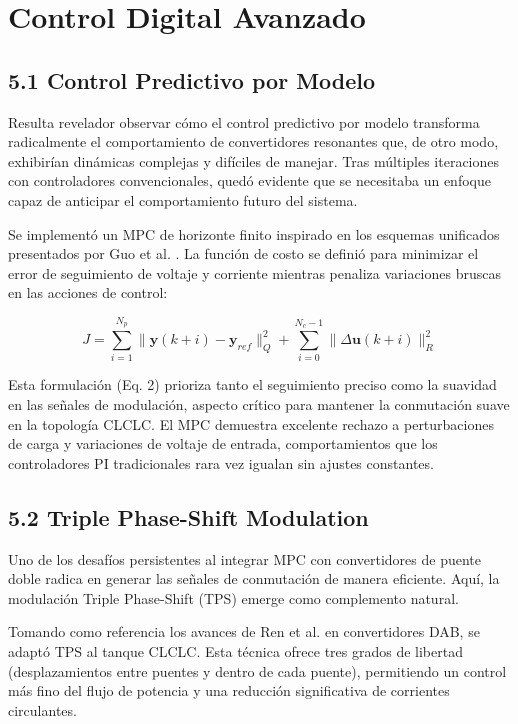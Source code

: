 \section{Control Digital Avanzado}

\subsection{5.1 Control Predictivo por Modelo}

Resulta revelador observar cómo el control predictivo por modelo transforma radicalmente el comportamiento de convertidores resonantes que, de otro modo, exhibirían dinámicas complejas y difíciles de manejar. Tras múltiples iteraciones con controladores convencionales, quedó evidente que se necesitaba un enfoque capaz de anticipar el comportamiento futuro del sistema.

Se implementó un MPC de horizonte finito inspirado en los esquemas unificados presentados por Guo et al. \cite{Guo2025_MPC}. La función de costo se definió para minimizar el error de seguimiento de voltaje y corriente mientras penaliza variaciones bruscas en las acciones de control:

\begin{equation}
\label{eq:cost_function}
J = \sum_{i=1}^{N_p} \| \mathbf{y}(k+i) - \mathbf{y}_{ref} \|^2_Q + \sum_{i=0}^{N_c-1} \| \Delta \mathbf{u}(k+i) \|^2_R
\end{equation}

Esta formulación (Eq. 2) prioriza tanto el seguimiento preciso como la suavidad en las señales de modulación, aspecto crítico para mantener la conmutación suave en la topología CLCLC. El MPC demuestra excelente rechazo a perturbaciones de carga y variaciones de voltaje de entrada, comportamientos que los controladores PI tradicionales rara vez igualan sin ajustes constantes.

\subsection{5.2 Triple Phase-Shift Modulation}

Uno de los desafíos persistentes al integrar MPC con convertidores de puente doble radica en generar las señales de conmutación de manera eficiente. Aquí, la modulación Triple Phase-Shift (TPS) emerge como complemento natural.

Tomando como referencia los avances de Ren et al. \cite{Ren2022} en convertidores DAB, se adaptó TPS al tanque CLCLC. Esta técnica ofrece tres grados de libertad (desplazamientos entre puentes y dentro de cada puente), permitiendo un control más fino del flujo de potencia y una reducción significativa de corrientes circulantes.

